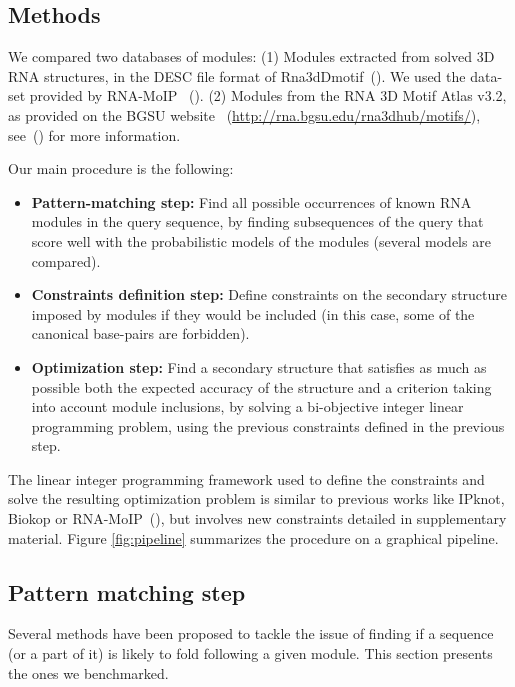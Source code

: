 \documentclass{bioinfo}
\begin{document}
\begin{methods}
\section{Methods}\label{sec:methods}
We  compared two databases of modules: (1) Modules extracted from solved 3D RNA structures, in the DESC file format of Rna3dDmotif~(\citealp{djelloul_automated_2008}). We used the data-set provided by RNA-MoIP ~(\citealp{djelloul_automated_2008,reinharz_towards_2012}). (2) Modules from the RNA 3D Motif Atlas v3.2, as provided on the BGSU website ~(\href{http://rna.bgsu.edu/rna3dhub/motifs/}{http://rna.bgsu.edu/rna3dhub/motifs/}), see~(\citealp{petrov_automated_2013}) for more information.

Our main procedure is the following:
\begin{itemize}
\item \textbf{Pattern-matching step:} Find all possible occurrences of known RNA modules in the query sequence, by finding subsequences of the query that score well with the probabilistic models of the modules (several models are compared).
\item \textbf{Constraints definition step:} Define constraints on the secondary structure imposed by modules if they would be included (in this case, some of the canonical base-pairs are forbidden).
 \item \textbf{Optimization step:} Find a secondary structure that satisfies as much as possible both the expected accuracy of the structure and a criterion taking into account module inclusions, by solving a bi-objective integer linear programming problem, using the previous constraints defined in the previous step.
\end{itemize}
  
The linear integer programming framework used to define the constraints and solve the resulting optimization problem is similar to previous works like IPknot, Biokop or RNA-MoIP~(\citealp{sato_ipknot:_2011,legendre_bi-objective_2018,reinharz_towards_2012}), but involves new constraints detailed in supplementary material. 
Figure \ref{fig:pipeline} summarizes the procedure on a graphical pipeline.
   
\subsection{Pattern matching step}\label{sec:models}
Several methods have been proposed to tackle the issue of finding if a sequence (or a part of it) is likely to fold following a given module. This section presents the ones we benchmarked.


\end{methods}
\end{document}
